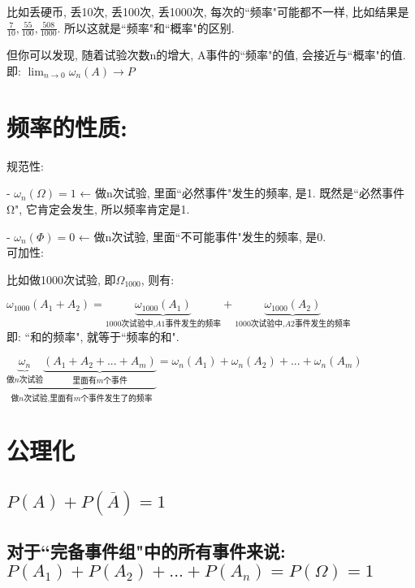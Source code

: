 \documentclass[UTF8]{ctexart}
\begin{document}
比如丢硬币, 丢10次, 丢100次, 丢1000次, 每次的``频率"可能都不一样, 比如结果是 $\frac{7}{10},\frac{55}{100},\frac{508}{1000} $. 所以这就是``频率"和``概率"的区别.

但你可以发现, 随着试验次数n的增大, A事件的``频率"的值, 会接近与``概率"的值. 即: $ \lim_{n→0}\omega _n\left( A \right)  \to P $


\section{频率的性质:}

规范性: 

- $\omega _n\left( \varOmega \right) =1$ ← 做n次试验, 里面``必然事件"发生的频率, 是1.  
既然是``必然事件Ω", 它肯定会发生, 所以频率肯定是1.


- $\omega _n\left( \varPhi \right) =0$ ← 做n次试验, 里面``不可能事件"发生的频率, 是0. \\



可加性: 


比如做1000次试验, 即$ \varOmega_{1000}$, 则有: 

$\omega _{1000}\left( A_1+A_2 \right) =\underset{1000\text{次试验中,}A1\text{事件发生的频率}}{\underbrace{\omega _{1000}\left( A_1 \right) }}+\underset{1000\text{次试验中,}A2\text{事件发生的频率}}{\underbrace{\omega _{1000}\left( A_2 \right) }}$ \\

即: ``和的频率", 就等于``频率的和".

$
\boxed{
\underset{\text{做}n\text{次试验,里面有}m\text{个事件发生了的频率}}{\underbrace{\underset{\text{做}n\text{次试验}}{\underbrace{\omega _n}}\underset{\text{里面有}m\text{个事件}}{\underbrace{\left( A_1+A_2+...+A_m \right) }}}}=\omega _n\left( A_1 \right) +\omega _n\left( A_2 \right) +...+\omega _n\left( A_m \right) 
}
$



	
\section{公理化}
	
	\subsection{$P(A) + P(\overline{A}) = 1$}
	
	\subsection{对于``完备事件组"中的所有事件来说: $P(A_1) + P(A_2) + ... +  P(A_n) =  P(\Omega) = 1$}
	
\end{document}
